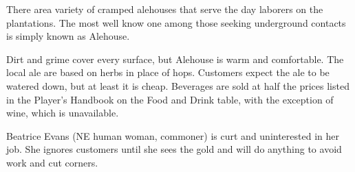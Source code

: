 There area variety of cramped alehouses that serve the day laborers on the plantations.
The most well know one among those seeking underground contacts is simply known as Alehouse.

Dirt and grime cover every surface, but Alehouse is warm and comfortable.
The local ale are based on herbs in place of hops.
Customers expect the ale to be watered down, but at least it is cheap.
Beverages are sold at half the prices listed in the Player's Handbook on the Food and Drink table, with the exception of wine, which is unavailable.

Beatrice Evans (NE human woman, commoner) is curt and uninterested in her job.
She ignores customers until she sees the gold and will do anything to avoid work and cut corners.
